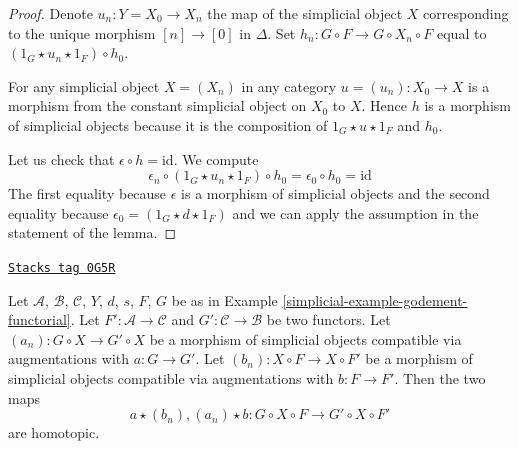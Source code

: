 \begin{proof}
Denote $u_n : Y = X_0 \to X_n$ the map of the simplicial object $X$
corresponding to the unique morphism $[n] \to [0]$ in $\Delta$.
Set $h_n : G \circ F \to G \circ X_n \circ F$ equal to
$(1_G \star u_n \star 1_F) \circ h_0$.

\medskip\noindent
For any simplicial object $X = (X_n)$ in any category
$u =(u_n) : X_0 \to X$ is a morphism from the constant simplicial object
on $X_0$ to $X$. Hence $h$ is a
morphism of simplicial objects because it is the composition of
$1_G \star u \star 1_F$ and $h_0$.

\medskip\noindent
Let us check that $\epsilon \circ h = \text{id}$. We compute
$$
\epsilon_n \circ (1_G \star u_n \star 1_F) \circ h_0 =
\epsilon_0 \circ h_0 = \text{id}
$$
The first equality because $\epsilon$ is a morphism of simplicial objects
and the second equality because
$\epsilon_0 = (1_G \star d \star 1_F)$ and we can apply the
assumption in the statement of the lemma.
\end{proof}

\begin{lemma}
\label{simplicial-lemma-godement-two-maps}
\href{https://stacks.math.columbia.edu/tag/0G5R}{\texttt{Stacks tag 0G5R}}

Let $\mathcal{A}$, $\mathcal{B}$, $\mathcal{C}$, $Y$, $d$, $s$, $F$, $G$
be as in Example \ref{simplicial-example-godement-functorial}. Let
$F' : \mathcal{A} \to \mathcal{C}$ and
$G' : \mathcal{C} \to \mathcal{B}$ be two functors.
Let $(a_n) : G \circ X \to G' \circ X$ be a morphism of simplicial objects
compatible via augmentations with $a : G \to G'$.
Let $(b_n) : X \circ F \to X \circ F'$ be a morphism of simplicial objects
compatible via augmentations with $b : F \to F'$. Then the two maps
$$
a \star (b_n), (a_n) \star b : G \circ X \circ F \to G' \circ X \circ F'
$$
are homotopic.
\end{lemma}

